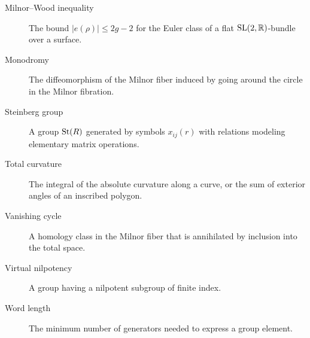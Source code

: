 \begin{description}
    \item[Milnor--Wood inequality] The bound \(|e(\rho)| \leq 2g-2\) for the Euler class of a flat \(\operatorname{SL}(2,\mathbb{R})\)-bundle over a surface.
    \item[Monodromy] The diffeomorphism of the Milnor fiber induced by going around the circle in the Milnor fibration.
    \item[Steinberg group] A group \(\operatorname{St}(R)\) generated by symbols \(x_{ij}(r)\) with relations modeling elementary matrix operations.
    \item[Total curvature] The integral of the absolute curvature along a curve, or the sum of exterior angles of an inscribed polygon.
    \item[Vanishing cycle] A homology class in the Milnor fiber that is annihilated by inclusion into the total space.
    \item[Virtual nilpotency] A group having a nilpotent subgroup of finite index.
    \item[Word length] The minimum number of generators needed to express a group element.
\end{description}
